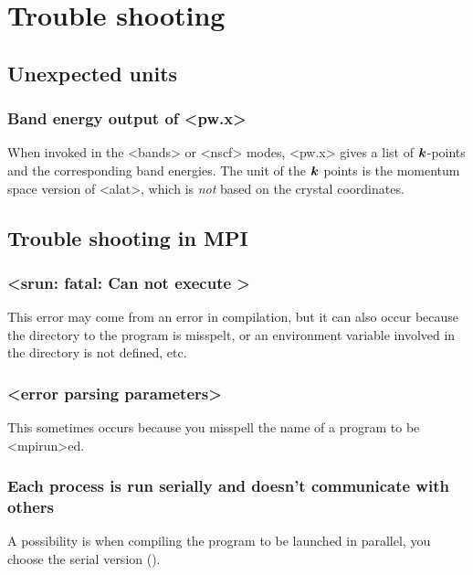 \documentclass[hyperref, a4paper, 12pt]{report}
\def\texttt#1{<#1>}%
\newcommand{\shortcode}[1]{\texttt{#1}}
\begin{document}
\chapter{Trouble shooting}

\section{Unexpected units}

\subsection{Band energy output of \shortcode{pw.x}}

When invoked in the \shortcode{bands} or \shortcode{nscf} modes, 
\shortcode{pw.x} gives a list of $\vb*{k}$-points 
and the corresponding band energies. 
The unit of the $\vb*{k}$ points is the momentum space version of \shortcode{alat},
which is \emph{not} based on the crystal coordinates.

\section{Trouble shooting in MPI}

\subsection{\shortcode{srun: fatal: Can not execute }}

This error may come from an error in compilation,
but it can also occur because the directory to the program is misspelt,
or an environment variable involved in the directory is not defined, etc. 

\subsection{\shortcode{error parsing parameters}}

This sometimes occurs because you misspell the name of a program 
to be \shortcode{mpirun}ed.

\subsection{Each process is run serially and doesn't communicate with others}

A possibility is when compiling the program to be launched in parallel,
you choose the serial version ().
\end{document}
